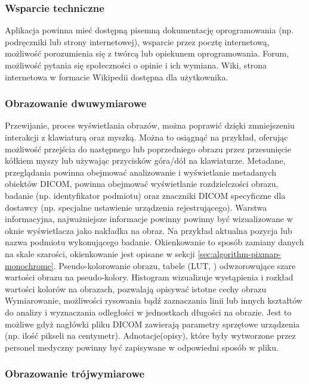 \subsubsection{Wsparcie techniczne}

Aplikacja powinna mieć dostępną pisemną dokumentację oprogramowania (np. podręczniki lub strony internetowej), wsparcie przez pocztę internetową, możliwość porozumienia się z twórcą lub opiekunem oprogramowania.
Forum, możliwość pytania się społeczności o opinie i ich wymiana.
Wiki, strona internetowa w formacie Wikipedii dostępna dla użytkownika.

\subsubsection{Obrazowanie dwuwymiarowe}

Przewijanie, proces wyświetlania obrazów, można poprawić dzięki zmniejszeniu interakcji z klawiaturą oraz myszką. Można to osiągnąć na przykład, oferując możliwość przejścia do następnego lub poprzedniego obrazu przez przesunięcie kółkiem myszy lub używając przycisków góra/dół na klawiaturze.
Metadane, przeglądania powinna obejmować analizowanie i wyświetlanie metadanych obiektów DICOM, powinna obejmować wyświetlanie rozdzielczości obrazu, badanie (np. identyfikator podmiotu) oraz znaczniki DICOM specyficzne dla dostawcy (np. specjalne ustawienie urządzenia rejestrującego).
Warstwa informacyjna, najważniejsze informacje powinny powinny być wizualizowane w oknie wyświetlacza jako nakładka na obraz.
Na przykład aktualna pozycja lub nazwa podmiotu wykonującego badanie.
Okienkowanie to sposób zamiany danych na skale szarości, okienkowanie jest opisane w sekcji \ref{sec:algorithm-pixmap-monochrome}.
Pseudo-kolorowanie obrazu, tabele (LUT, ) odwzorowujące szare wartości obrazu na pseudo-kolory.
Histogram wizualizuje wystąpienia i rozkład wartości kolorów na obrazach, pozwalają opisywać istotne cechy obrazu
Wymiarowanie, możliwości rysowania bądź zaznaczania linii lub innych kształtów do analizy i wyznaczania odległości w jednostkach długości na obrazie.
Jest to możliwe gdyż nagłówki pliku DICOM zawierają parametry sprzętowe urządzenia (np. ilość pikseli na centymetr).
Adnotacje(opisy), które były wytworzone przez personel medyczny powinny być zapisywane w odpowiedni sposób w pliku.

\subsubsection{Obrazowanie trójwymiarowe}

